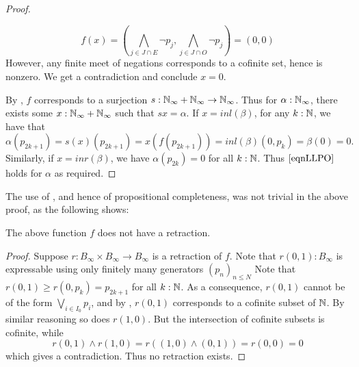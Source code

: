 \begin{proof}
\begin{itemize}
      $$f(x) = (\bigwedge_{j\in J \cap E } \neg p_j , \bigwedge_{j\in J \cap O } \neg p_j ) = (0,0)$$
      However, any finite meet of negations corresponds to a cofinite set, hence is nonzero. 
      We get a contradiction and conclude $x=0$. 
  \end{itemize}
  By , $f$ corresponds to a surjection 
  $s:\mathbb{N}_{\infty} + \mathbb{N}_{\infty} \to \mathbb{N}_{\infty}$.
  Thus for $\alpha : \mathbb{N}_{\infty}$, 
  there exists some $x:\mathbb{N}_{\infty} + \mathbb{N}_{\infty}$ such that $s x = \alpha$. 
  If $x = inl(\beta)$, 
  for any $k:\mathbb{N}$, we have that 
  $$\alpha (p_{2k+1}) = s(x) (p_{2k+1}) = x(f(p_{2k+1})) = inl(\beta) (0,p_k)  = \beta(0) = 0.$$
  Similarly, if $x = inr(\beta)$, we have $\alpha(p_{2k}) = 0$ for all $k:\mathbb{N}$. 
  Thus $\Cref{eqnLLPO}$ holds for $\alpha$ as required. 
\end{proof}

The use of , and hence of propositional completeness, 
was not trivial in the above proof, as the following shows:
\begin{lemma}
  The above function $f$ does not have a retraction. 
\end{lemma}
\begin{proof}
  Suppose $r:B_\infty \times B_\infty \to B_\infty$ is a retraction of $f$. 
  Note that $r(0,1):B_\infty$ is expressable using only finitely many generators $(p_n)_{n\leq N}$
  Note that $r(0,1) \geq r(0,p_k) = p_{2k+1}$ for all $k:\mathbb{N}$. 
  As a consequence, $r(0,1)$ cannot be of the form $\bigvee_{i\in I_0} p_i$, and by , 
  $r(0,1)$ corresponds to a cofinite subset of $\mathbb{N}$. %
  By similar reasoning so does $r(1,0)$.%
  But the intersection of cofinite subsets is cofinite, while 
  $$r(0,1) \wedge r(1,0) = r( (1,0) \wedge (0,1)) = r(0,0) = 0$$
  which gives a contradiction. Thus no retraction exists. 
\end{proof}

